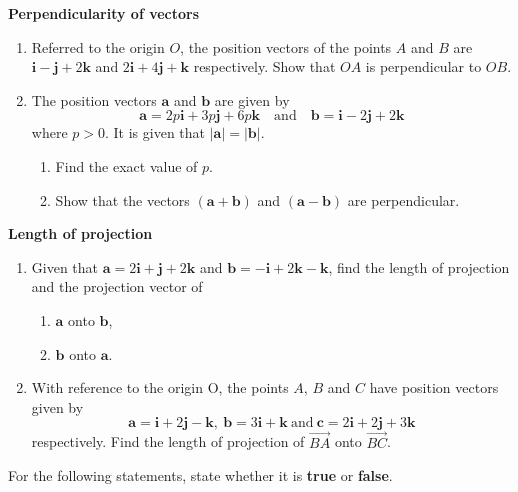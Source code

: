 \documentclass[a4paper,11pt,oneside]{book}
\providecommand{\vv}[1]{\overrightarrow{#1}}\providecommand{\cvv}[3]{\begin{pmatrix}#1\\#2\\#3\end{pmatrix}}
\newcounter{wq}[section]
\newcommand{\Q}[1]{\par\needspace{5\baselineskip}\medskip\stepcounter{wq}\noindent\textbf{\thewq}\quad #1\par}
\begin{document}
\Q{\textbf{Perpendicularity of vectors}\par\smallskip \begin{enumerate}[label=(\alph*)]
\item Referred to the origin $O$, the position vectors of the points $A$ and $B$ are $\mathbf i-\mathbf j+2\mathbf k$ and $2\mathbf i+4\mathbf j+\mathbf k$ respectively. Show that $OA$ is perpendicular to $OB$.
\item The position vectors $\mathbf a$ and $\mathbf b$ are given by
\[
\mathbf a=2p\mathbf i+3p\mathbf j+6p\mathbf k\quad\text{and}\quad\mathbf b=\mathbf i-2\mathbf j+2\mathbf k
\]
where $p>0$. It is given that $|\mathbf a|=|\mathbf b|$.
\begin{enumerate}[label=(\roman*)]
\item Find the exact value of $p$.
\item Show that the vectors $(\mathbf a+\mathbf b)$ and $(\mathbf a-\mathbf b)$ are perpendicular.
\end{enumerate}
\end{enumerate}}
\Q{\textbf{Length of projection}\par\smallskip \begin{enumerate}[label=(\alph*)]
\item Given that $\mathbf a=2\mathbf i+\mathbf j+2\mathbf k$ and $\mathbf b=-\mathbf i+2\mathbf k-\mathbf k$, find the length of projection and the projection vector of
\begin{enumerate}[label=(\roman*)]
\item $\mathbf a$ onto $\mathbf b$,
\item $\mathbf b$ onto $\mathbf a$.
\end{enumerate}
\item With reference to the origin O, the points $A$, $B$ and $C$ have position vectors given by
\[
\mathbf a=\mathbf i+2\mathbf j-\mathbf k,\ \mathbf b=3\mathbf i+\mathbf k\ \text{and}\ \mathbf c=2\mathbf i+2\mathbf j+3\mathbf k
\]
respectively. Find the length of projection of $\vv{BA}$ onto $\vv{BC}$.
\end{enumerate}}
\endgroup
\clearpage
\Q{For the following statements, state whether it is \textbf{true} or \textbf{false}.}
\end{document}
